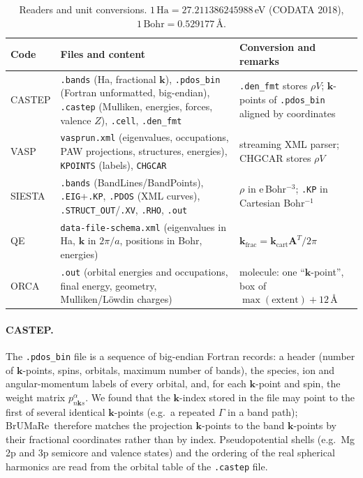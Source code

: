 \documentclass[11pt,a4paper]{article}
\newcommand{\code}[1]{\texttt{#1}}
\newcommand{\BMR}{\textsf{BrUMa\textcolor[HTML]{B26B00}{Re}}}
\begin{document}
\begin{table}[t]\centering\small
\caption{Readers and unit conversions. $1\,\mathrm{Ha}=27.211386245988$\,eV (CODATA 2018), $1\,\mathrm{Bohr}=0.529177$\,\AA.}\label{tab:readers}
\begin{tabularx}{\linewidth}{@{}lXX@{}}\toprule
Code & Files and content & Conversion and remarks \\\midrule
CASTEP & \code{.bands} (Ha, fractional $\bm{k}$), \code{.pdos\_bin} (Fortran unformatted, big-endian), \code{.castep} (Mulliken, energies, forces, valence $Z$), \code{.cell}, \code{.den\_fmt} & \code{.den\_fmt} stores $\rho V$; $\bm{k}$-points of \code{.pdos\_bin} aligned by coordinates \\
VASP & \code{vasprun.xml} (eigenvalues, occupations, PAW projections, structures, energies), \code{KPOINTS} (labels), \code{CHGCAR} & streaming XML parser; CHGCAR stores $\rho V$ \\
SIESTA & \code{.bands} (BandLines/BandPoints), \code{.EIG}+\code{.KP}, \code{.PDOS} (XML curves), \code{.STRUCT\_OUT}/\code{.XV}, \code{.RHO}, \code{.out} & $\rho$ in e\,Bohr$^{-3}$; \code{.KP} in Cartesian Bohr$^{-1}$ \\
QE & \code{data-file-schema.xml} (eigenvalues in Ha, $\bm{k}$ in $2\pi/a$, positions in Bohr, energies) & $\bm{k}_\mathrm{frac}=\bm{k}_\mathrm{cart}\mathbf A^{T}/2\pi$ \\
ORCA & \code{.out} (orbital energies and occupations, final energy, geometry, Mulliken/Löwdin charges) & molecule: one ``$\bm{k}$-point'', box of $\max(\text{extent})+12$\,\AA \\\bottomrule
\end{tabularx}
\end{table}

\paragraph{CASTEP.} The \code{.pdos\_bin} file is a sequence of big-endian Fortran records: a header (number of $\bm{k}$-points, spins, orbitals, maximum number of bands), the species, ion and angular-momentum labels of every orbital, and, for each $\bm{k}$-point and spin, the weight matrix $p^{\alpha}_{n\bm{k} s}$. We found that the $\bm{k}$-index stored in the file may point to the first of several identical $\bm{k}$-points (e.g.\ a repeated $\Gamma$ in a band path); \BMR\ therefore matches the projection $\bm{k}$-points to the band $\bm{k}$-points by their fractional coordinates rather than by index. Pseudopotential shells (e.g.\ Mg 2p and 3p semicore and valence states) and the ordering of the real spherical harmonics are read from the orbital table of the \code{.castep} file.
\end{document}
